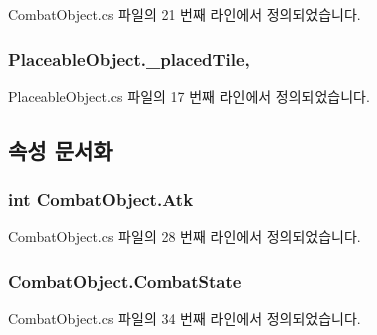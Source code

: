 Combat\+Object.\+cs 파일의 21 번째 라인에서 정의되었습니다.

\subsubsection[{\texorpdfstring{\+\_\+placed\+Tile}{_placedTile}}]{ Placeable\+Object.\+\_\+placed\+Tile\hspace{0.3cm}{\ttfamily [protected]}, {\ttfamily [inherited]}}\hypertarget{class_placeable_object_a0fd0566f0bb15c71b0630322762342d8}{}\label{class_placeable_object_a0fd0566f0bb15c71b0630322762342d8}


Placeable\+Object.\+cs 파일의 17 번째 라인에서 정의되었습니다.



\subsection{속성 문서화}
\subsubsection[{\texorpdfstring{Atk}{Atk}}]{\setlength{\rightskip}{0pt plus 5cm}int Combat\+Object.\+Atk\hspace{0.3cm}{\ttfamily [get]}}\hypertarget{class_combat_object_a96cb990e2f70cf963e6a1f8f4e992efa}{}\label{class_combat_object_a96cb990e2f70cf963e6a1f8f4e992efa}


Combat\+Object.\+cs 파일의 28 번째 라인에서 정의되었습니다.

\subsubsection[{\texorpdfstring{Combat\+State}{CombatState}}]{ Combat\+Object.\+Combat\+State\hspace{0.3cm}{\ttfamily [get]}}\hypertarget{class_combat_object_a25cac282f047475ab61d9f4b6187c9da}{}\label{class_combat_object_a25cac282f047475ab61d9f4b6187c9da}


Combat\+Object.\+cs 파일의 34 번째 라인에서 정의되었습니다.

